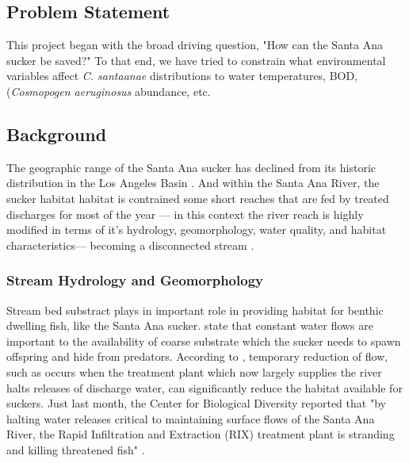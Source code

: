 \documentclass{article}
\begin{document}
\subsection{Problem Statement}

This project began with the broad driving question, "How can the Santa Ana sucker be saved?" To that end, we have tried to constrain what environmental variables affect \emph{C. santaanae} distributions to water temperatures, BOD, (\emph{Cosmopogen aeruginosus} abundance, etc. 

\subsection{Background}

The geographic range of the Santa Ana sucker has declined from its historic distribution in the Los Angeles Basin \citep{brown2005aquatic, saiki2007life}. And within the Santa Ana River, the sucker habitat habitat is contrained some short reaches that are fed by treated discharges for most of the year --- in this context the river reach is highly modified in terms of it's hydrology, geomorphology,  water quality, and habitat characteristics--- becoming a disconnected stream \citep{poole2002fluvial}. 

\subsubsection{Stream Hydrology and Geomorphology}

Stream bed substract plays in important role in providing habitat for benthic dwelling fish, like the Santa Ana sucker. \citet{baskerville2012recovery} state that constant water flows are important to the availability of coarse substrate which the sucker needs to spawn offspring and hide from predators. According to \citet{evans2005long}, temporary reduction of flow, such as occurs when the treatment plant which now largely supplies the river halts releases of discharge water, can significantly reduce the habitat available for suckers. Just last month, the Center for Biological Diversity reported that "by halting water releases critical to maintaining surface flows of the Santa Ana River, the Rapid Infiltration and Extraction (RIX) treatment plant is stranding and killing threatened fish" \citep{evans2005draft}. 
\end{document}
